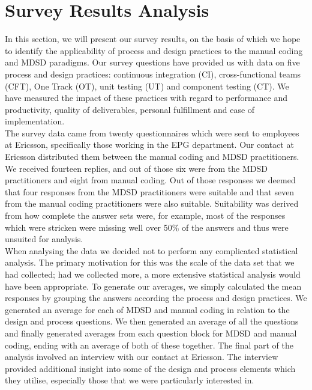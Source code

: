 \documentclass[final_report_innit.tex]{subfiles}
\begin{document}
\section{Survey Results Analysis}

In this section, we will present our survey results, on the basis of which we hope to identify the applicability of process and design practices to the manual coding and MDSD paradigms. Our survey questions have provided us with data on five process and design practices: continuous integration (CI), cross-functional teams (CFT), One Track (OT), unit testing (UT) and component testing (CT). We have measured the impact of these practices with regard to performance and productivity, quality of deliverables, personal fulfillment and ease of implementation.
\\

The survey data came from twenty questionnaires which were sent to employees at Ericsson, specifically those working in the EPG department. Our contact at Ericsson distributed them between the manual coding and MDSD practitioners. We received fourteen replies, and out of those six were from the MDSD practitioners and eight from manual coding. Out of those responses we deemed that four responses from the MDSD practitioners were suitable and that seven from the manual coding practitioners were also suitable. Suitability was derived from how complete the answer sets were, for example, most of the responses which were stricken were missing well over 50\% of the answers and thus were unsuited for analysis.
\\

When analysing the data we decided not to perform any complicated statistical analysis. The primary motivation for this was the scale of the data set that we had collected; had we collected more, a more extensive statistical analysis would have been appropriate. To generate our averages, we simply calculated the mean responses by grouping the answers according the process and design practices. We generated an average for each of MDSD and manual coding in relation to the design and process questions. We then generated an average of all the questions and finally generated averages from each question block for MDSD and manual coding, ending with an average of both of these together. The final part of the analysis involved an interview with our contact at Ericsson. The interview provided additional insight into some of the design and process elements which they utilise, especially those that we were particularly interested in.
\\
\end{document}
